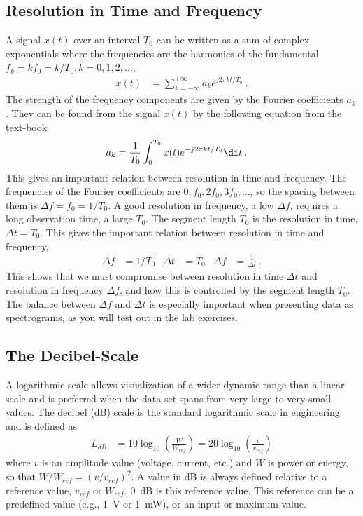 \subsection{Resolution in Time and Frequency} \label{tf-resolution}
A signal $x(t)$ over an interval $T_0$ can be written as a sum of complex exponentials where the frequencies are the harmonics of the fundamental $f_k= kf_0=k/T_0, k=0, 1, 2, \ldots$, 
\begin{align}
	x(t) &= \sum_{k=-\infty}^{+\infty} a_k e^{j2\pi k t/T_0 }  \:.
	\label{eq:fourier-synthesis}
\end{align}
The strength of the frequency components are given by the Fourier coefficients $a_k$.
They can be found from the signal $x(t)$ by the following equation from the text-book \cite{mcclellan_dsp_2016} 
\begin{align}
	a_k &= \frac{1}{T_0} \int_{0}^{T_0} x(t) e^{-j2\pi k t/T_0 } \di t 	\:.
	\label{eq:fourier-coefficients}
\end{align}
This gives an important relation between resolution in time and frequency. The frequencies of the Fourier coefficients are $0, f_0, 2f_0, 3f_0, \ldots$, so the spacing between them is $\Delta f = f_0 = 1/T_0$. 
A good resolution in frequency, a low $\Delta f$, requires a long observation time, a large $T_0$. The segment length $T_0$ is the resolution in time, $\Delta t = T_0$. 
This gives the important relation between resolution in time and frequency,
\begin{align}
	\Delta f &= 1/T_0 	&	\Delta t &= T_0	&	\Delta f &= \frac{1}{\Delta t} 
	\:.
\end{align}
This shows that we must compromise between resolution in time $\Delta t$ and resolution in frequency $\Delta f$, and how this is controlled by the segment length $T_0$. 
The balance between $\Delta f$ and $\Delta t$ is especially important when presenting data as spectrograms, as you will test out in the lab exercises.
 

\subsection{The Decibel-Scale}
A logarithmic scale allows visualization of a wider dynamic range than a linear scale and is preferred when the data set spans from very large to very small values. The decibel (dB) scale is the standard logarithmic scale in engineering and is defined as 
\begin{align}
	L_{dB}&= 10 \log_{10} \left(\frac{W}{W_{ref}} \right) = 20 \log_{10} \left(\frac{v}{v_{ref}} \right) 
\end{align}
where $v$ is an amplitude value (voltage, current, etc.) and $W$ is power or energy, so that $W/W_{ref}= (v/v_{ref})^2$. A value in \unit{dB} is always defined relative to a reference value, $v_{ref}$ or  $W_{ref}$. \qty{0}{dB} is this reference value. This reference can be a predefined value (e.g., \qty{1}{V} or \qty{1}{mW}), or an input or maximum value.

